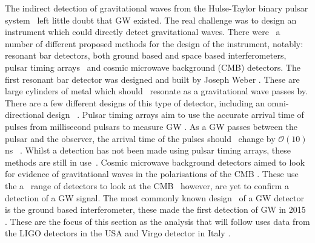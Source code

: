 The indirect detection of gravitational waves from the Hulse-Taylor binary
pulsar system~ left little doubt that \gls{GW} existed.  The
real challenge was to design an instrument which could directly detect
gravitational waves.  There were~ a number of different proposed
methods for the design of the instrument, notably: resonant bar detectors, both
ground based and space based interferometers, pulsar timing arrays~ and cosmic microwave background (CMB)
detectors. The first resonant bar detector was designed and built by Joseph
Weber \citep{weber1966ObservationThermal}.  These are large cylinders of metal
which should~
resonate as a gravitational wave passes by.  There are a few different designs
of this type of detector, including an omni-directional design
\citep{dewaard2003MiniGRAILFirst}~. Pulsar timing arrays aim to use the accurate arrival time of pulses
from millisecond pulsars to measure \gls{GW}
\citep{hobbs2017GravitationalWave}. As a \gls{GW} passes between the pulsar and
the observer, the arrival time of the pulses should~ change by $\mathcal{O}(10)$ ns
\citep{hobbs2017GravitationalWave}~.  Whilst a
detection has not been made using pulsar timing arrays, these methods are still
in use~.  Cosmic
microwave background detectors aimed to look~ for evidence of
gravitational waves in the polarisations of the CMB
\citep{ade2018ConstraintsPrimordial}.  These use the a~ range of
detectors to look at the CMB~ however, are yet to
confirm a detection of a \gls{GW} signal.  The most commonly known
design~ of a \gls{GW} detector is the ground based interferometer, these
made the first detection of \gls{GW} in 2015
\citep{abbott2016ObservationGravitational}.  These are the focus of this
section as the analysis that will follow uses data from the \gls{LIGO}
detectors in the USA \citep{abbott2009LIGOLaser,aasi2015AdvancedLIGO} and Virgo
detector in Italy
\citep{acernese2015AdvancedVirgo,acernese2008StatusVirgo}.~ 

